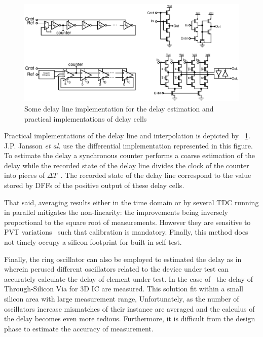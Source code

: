 \begin{figure}[htp]
    \centering
    \includegraphics[width=\textwidth]{Chapter5/Figs/delay_line_implementation_possible.ps}
    \caption{Some delay line implementation for the delay estimation and practical implementations of delay cells}
    \label{fig:delay_vernier_interpolation}
\end{figure}

Practical implementations of the delay line and interpolation is depicted by \figurename~\ref{fig:delay_vernier_interpolation}. J.P. Jansson \textit{et al.} use the differential implementation represented in this figure. To estimate the delay a synchronous counter performs a coarse estimation of the delay while the recorded state of the delay line divides the clock of the counter into pieces of \(\Delta T\)~\cite{1637593}. The recorded state of the delay line correspond to the value stored by DFFs of the positive output of these delay cells.

That said, averaging results either in the time domain or by several TDC running in parallel mitigates the non-linearity: the improvements being inversely proportional to the square root of measurements. However they are sensitive to PVT variations~\cite{6233014, 5256168} such that calibration is mandatory. Finally, this method does not timely occupy a silicon footprint for built-in self-test.

Finally, the ring oscillator can also be employed to estimated the delay as in~\cite{8267856} wherein perused different oscillators related to the device under test can accurately calculate the delay of element under test. In the case of~\cite{8267856} the delay of Through-Silicon Via for 3D IC are measured. This solution fit within a small silicon area with large measurement range, Unfortunately, as the number of oscillators increase mismatches of their instance are averaged and the calculus of the delay becomes even more tedious. Furthermore, it is difficult from the design phase to estimate the accuracy of measurement.

